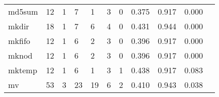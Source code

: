 \begin{longtable}{lp{1.20cm}p{1.20cm}p{1.20cm}p{1.20cm}p{1.20cm}p{1.20cm}p{1.20cm}p{1.20cm}p{1.20cm}p{1.20cm}}
md5sum    &                                    12 &                                                  1 &                                                  7 &                                                  1 &                                                  3 &                                                  0 &                                         0.375 &                                              0.917 &                                              0.000 \\
mkdir     &                                    18 &                                                  1 &                                                  7 &                                                  6 &                                                  4 &                                                  0 &                                         0.431 &                                              0.944 &                                              0.000 \\
mkfifo    &                                    12 &                                                  1 &                                                  6 &                                                  2 &                                                  3 &                                                  0 &                                         0.396 &                                              0.917 &                                              0.000 \\
mknod     &                                    12 &                                                  1 &                                                  6 &                                                  2 &                                                  3 &                                                  0 &                                         0.396 &                                              0.917 &                                              0.000 \\
mktemp    &                                    12 &                                                  1 &                                                  6 &                                                  1 &                                                  3 &                                                  1 &                                         0.438 &                                              0.917 &                                              0.083 \\
mv        &                                    53 &                                                  3 &                                                 23 &                                                 19 &                                                  6 &                                                  2 &                                         0.410 &                                              0.943 &                                              0.038 \\

\end{longtable}
